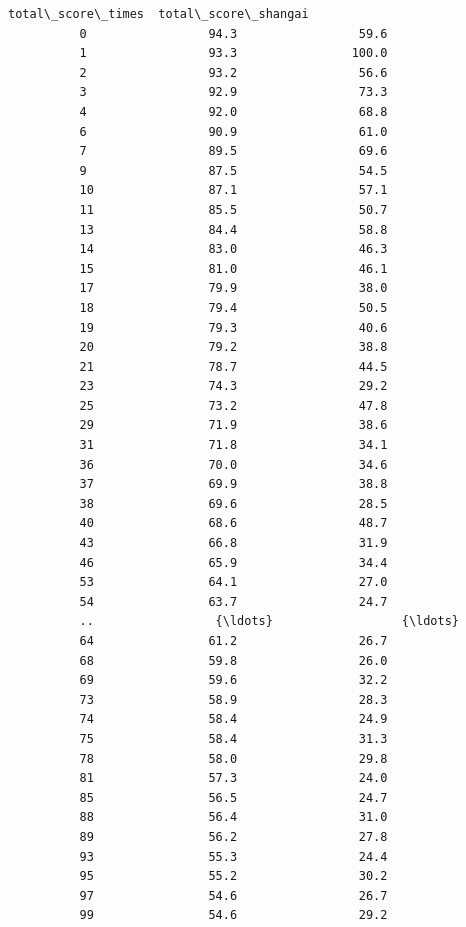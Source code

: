 \documentclass[11pt]{article}
\begin{document}
\begin{Verbatim}[commandchars=\\\{\}]
               total\_score\_times  total\_score\_shangai  
          0                 94.3                 59.6  
          1                 93.3                100.0  
          2                 93.2                 56.6  
          3                 92.9                 73.3  
          4                 92.0                 68.8  
          6                 90.9                 61.0  
          7                 89.5                 69.6  
          9                 87.5                 54.5  
          10                87.1                 57.1  
          11                85.5                 50.7  
          13                84.4                 58.8  
          14                83.0                 46.3  
          15                81.0                 46.1  
          17                79.9                 38.0  
          18                79.4                 50.5  
          19                79.3                 40.6  
          20                79.2                 38.8  
          21                78.7                 44.5  
          23                74.3                 29.2  
          25                73.2                 47.8  
          29                71.9                 38.6  
          31                71.8                 34.1  
          36                70.0                 34.6  
          37                69.9                 38.8  
          38                69.6                 28.5  
          40                68.6                 48.7  
          43                66.8                 31.9  
          46                65.9                 34.4  
          53                64.1                 27.0  
          54                63.7                 24.7  
          ..                 {\ldots}                  {\ldots}  
          64                61.2                 26.7  
          68                59.8                 26.0  
          69                59.6                 32.2  
          73                58.9                 28.3  
          74                58.4                 24.9  
          75                58.4                 31.3  
          78                58.0                 29.8  
          81                57.3                 24.0  
          85                56.5                 24.7  
          88                56.4                 31.0  
          89                56.2                 27.8  
          93                55.3                 24.4  
          95                55.2                 30.2  
          97                54.6                 26.7  
          99                54.6                 29.2  

\end{Verbatim}
\end{document}
